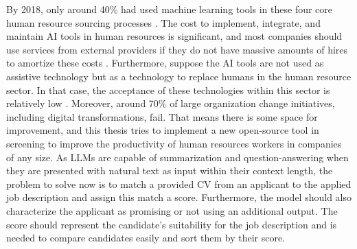 \documentclass[draft,final]{thesisclass} %
\begin{document}
By 2018, only around 40\% had used machine learning tools in these four core human resource sourcing processes \parencite[4]{ai_recruiting}.
The cost to implement, integrate, and maintain \acs{AI} tools in human resources is significant, and most companies should use services from external providers if they do not have massive amounts of hires to amortize these costs \parencite[8]{ai_recruiting}.
Furthermore, suppose the \acs{AI} tools are not used as assistive technology but as a technology to replace humans in the human resource sector. In that case, the acceptance of these technologies within this sector is relatively low \parencite[9]{ai_recruiting}.
Moreover, around 70\% of large organization change initiatives, including digital transformations, fail.
That means there is some space for improvement, and this thesis tries to implement a new open-source tool in screening to improve the productivity of human resources workers in companies of any size.
As \acs{LLM}s are capable of summarization and question-answering when they are presented with natural text as input within their context length, the problem to solve now is to match a provided \acs{CV} from an applicant to the applied job description and assign this match a score.
Furthermore, the model should also characterize the applicant as promising or not using an additional output.
The score should represent the candidate's suitability for the job description and is needed to compare candidates easily and sort them by their score.
\end{document}
